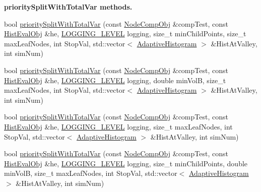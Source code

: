 \begin{Indent}{\bf priority\-Split\-With\-Total\-Var methods.}\par
\begin{DoxyCompactItemize}
\item 
bool \hyperlink{classsubpavings_1_1AdaptiveHistogram_a6a4b39b06259e03b84b5131299334416}{priority\-Split\-With\-Total\-Var} (const \hyperlink{classsubpavings_1_1NodeCompObj}{\-Node\-Comp\-Obj} \&comp\-Test, const \hyperlink{classsubpavings_1_1HistEvalObj}{\-Hist\-Eval\-Obj} \&he, \hyperlink{namespacesubpavings_aef8e51096b59ecaf1a1e9b2ee24b6089}{\-L\-O\-G\-G\-I\-N\-G\-\_\-\-L\-E\-V\-E\-L} logging, size\-\_\-t min\-Child\-Points, size\-\_\-t max\-Leaf\-Nodes, int \-Stop\-Val, std\-::vector$<$ \hyperlink{classsubpavings_1_1AdaptiveHistogram}{\-Adaptive\-Histogram} $>$ \&\-Hist\-At\-Valley, int sim\-Num)
\item 
bool \hyperlink{classsubpavings_1_1AdaptiveHistogram_a4c7ccb75b629b131c7a448579386c6a9}{priority\-Split\-With\-Total\-Var} (const \hyperlink{classsubpavings_1_1NodeCompObj}{\-Node\-Comp\-Obj} \&comp\-Test, const \hyperlink{classsubpavings_1_1HistEvalObj}{\-Hist\-Eval\-Obj} \&he, \hyperlink{namespacesubpavings_aef8e51096b59ecaf1a1e9b2ee24b6089}{\-L\-O\-G\-G\-I\-N\-G\-\_\-\-L\-E\-V\-E\-L} logging, double min\-Vol\-B, size\-\_\-t max\-Leaf\-Nodes, int \-Stop\-Val, std\-::vector$<$ \hyperlink{classsubpavings_1_1AdaptiveHistogram}{\-Adaptive\-Histogram} $>$ \&\-Hist\-At\-Valley, int sim\-Num)
\item 
bool \hyperlink{classsubpavings_1_1AdaptiveHistogram_a435e13db001d1b919489507b81cb49ad}{priority\-Split\-With\-Total\-Var} (const \hyperlink{classsubpavings_1_1NodeCompObj}{\-Node\-Comp\-Obj} \&comp\-Test, const \hyperlink{classsubpavings_1_1HistEvalObj}{\-Hist\-Eval\-Obj} \&he, \hyperlink{namespacesubpavings_aef8e51096b59ecaf1a1e9b2ee24b6089}{\-L\-O\-G\-G\-I\-N\-G\-\_\-\-L\-E\-V\-E\-L} logging, size\-\_\-t max\-Leaf\-Nodes, int \-Stop\-Val, std\-::vector$<$ \hyperlink{classsubpavings_1_1AdaptiveHistogram}{\-Adaptive\-Histogram} $>$ \&\-Hist\-At\-Valley, int sim\-Num)
\item 
bool \hyperlink{classsubpavings_1_1AdaptiveHistogram_ae7e68baa3f16fafe3774df1f570aadcc}{priority\-Split\-With\-Total\-Var} (const \hyperlink{classsubpavings_1_1NodeCompObj}{\-Node\-Comp\-Obj} \&comp\-Test, const \hyperlink{classsubpavings_1_1HistEvalObj}{\-Hist\-Eval\-Obj} \&he, \hyperlink{namespacesubpavings_aef8e51096b59ecaf1a1e9b2ee24b6089}{\-L\-O\-G\-G\-I\-N\-G\-\_\-\-L\-E\-V\-E\-L} logging, size\-\_\-t min\-Child\-Points, double min\-Vol\-B, size\-\_\-t max\-Leaf\-Nodes, int \-Stop\-Val, std\-::vector$<$ \hyperlink{classsubpavings_1_1AdaptiveHistogram}{\-Adaptive\-Histogram} $>$ \&\-Hist\-At\-Valley, int sim\-Num)

\end{DoxyCompactItemize}
\end{Indent}

